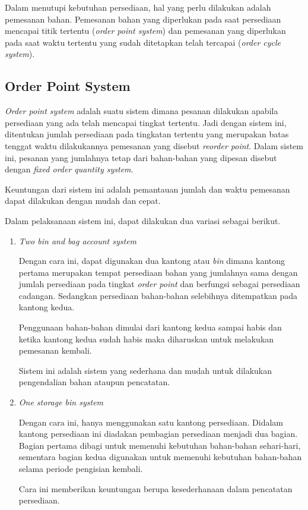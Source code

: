 Dalam menutupi kebutuhan persediaan, hal yang perlu dilakukan adalah pemesanan bahan. Pemesanan bahan yang diperlukan pada saat persediaan mencapai titik tertentu (\textit{order point system}) dan pemesanan yang diperlukan pada saat waktu tertentu yang sudah ditetapkan telah tercapai (\textit{order cycle system}).

\subsection{Order Point System} 
	

	\textit{Order point system} adalah suatu sistem dimana pesanan dilakukan apabila persediaan yang ada telah mencapai tingkat tertentu. Jadi dengan sistem ini, ditentukan jumlah persediaan pada tingkatan tertentu yang merupakan batas tenggat waktu dilakukannya pemesanan yang disebut \textit{reorder point}. Dalam sistem ini, pesanan yang jumlahnya tetap dari bahan-bahan yang dipesan disebut dengan \textit{fixed order quantity system}. 

	Keuntungan dari sistem ini adalah pemantauan jumlah dan waktu pemesanan dapat dilakukan dengan mudah dan cepat.

	Dalam pelaksanaan sistem ini, dapat dilakukan dua variasi sebagai berikut.

	\begin{enumerate}
		\item \textit{Two bin and bag account system}
		
		Dengan cara ini, dapat digunakan dua kantong atau \textit{bin} dimana kantong pertama merupakan tempat persediaan bahan yang jumlahnya sama dengan jumlah persediaan pada tingkat \textit{order point} dan berfungsi sebagai persediaan cadangan. Sedangkan persediaan bahan-bahan selebihnya ditempatkan pada kantong kedua.

		Penggunaan bahan-bahan dimulai dari kantong kedua sampai habis dan ketika kantong kedua sudah habis maka diharuskan untuk melakukan pemesanan kembali.

		Sistem ini adalah sistem yang sederhana dan mudah untuk dilakukan pengendalian bahan ataupun pencatatan.

		\item \textit{One storage bin system}
		
		Dengan cara ini, hanya menggunakan satu kantong persediaan. Didalam kantong persediaan ini diadakan pembagian persediaan menjadi dua bagian. Bagian pertama dibagi untuk memenuhi kebutuhan bahan-bahan sehari-hari, sementara bagian kedua digunakan untuk memenuhi kebutuhan bahan-bahan selama periode pengisian kembali.

		Cara ini memberikan keuntungan berupa kesederhanaan dalam pencatatan persediaan.
	\end{enumerate}

